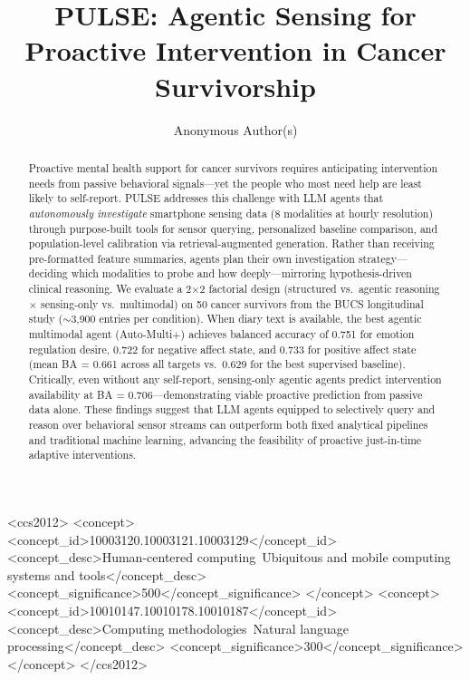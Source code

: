 \documentclass[screen,review,anonymous]{acmart}
\newcommand{\sysshort}{PULSE}
\begin{document}
\title{PULSE: Agentic Sensing for Proactive Intervention in Cancer Survivorship}

\author{Anonymous Author(s)}

\begin{abstract}
Proactive mental health support for cancer survivors requires anticipating intervention needs from passive behavioral signals---yet the people who most need help are least likely to self-report. \sysshort{} addresses this challenge with LLM agents that \emph{autonomously investigate} smartphone sensing data (8 modalities at hourly resolution) through purpose-built tools for sensor querying, personalized baseline comparison, and population-level calibration via retrieval-augmented generation. Rather than receiving pre-formatted feature summaries, agents plan their own investigation strategy---deciding which modalities to probe and how deeply---mirroring hypothesis-driven clinical reasoning. We evaluate a 2$\times$2 factorial design (structured vs.\ agentic reasoning $\times$ sensing-only vs.\ multimodal) on 50 cancer survivors from the BUCS longitudinal study (${\sim}$3,900 entries per condition). When diary text is available, the best agentic multimodal agent (Auto-Multi+) achieves balanced accuracy of 0.751 for emotion regulation desire, 0.722 for negative affect state, and 0.733 for positive affect state (mean BA = 0.661 across all targets vs.\ 0.629 for the best supervised baseline). Critically, even without any self-report, sensing-only agentic agents predict intervention availability at BA = 0.706---demonstrating viable proactive prediction from passive data alone. These findings suggest that LLM agents equipped to selectively query and reason over behavioral sensor streams can outperform both fixed analytical pipelines and traditional machine learning, advancing the feasibility of proactive just-in-time adaptive interventions.
\end{abstract}

\begin{CCSXML}
<ccs2012>
   <concept>
       <concept_id>10003120.10003121.10003129</concept_id>
       <concept_desc>Human-centered computing~Ubiquitous and mobile computing systems and tools</concept_desc>
       <concept_significance>500</concept_significance>
   </concept>
   <concept>
       <concept_id>10010147.10010178.10010187</concept_id>
       <concept_desc>Computing methodologies~Natural language processing</concept_desc>
       <concept_significance>300</concept_significance>
   </concept>
</ccs2012>
\end{CCSXML}
\end{document}
